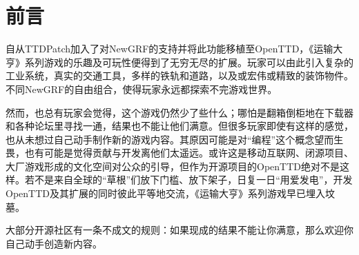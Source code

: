 \section{前言}
\par 
自从TTDPatch加入了对NewGRF的支持并将此功能移植至OpenTTD，《运输大亨》系列游戏的乐趣及可玩性便得到了无穷无尽的扩展。玩家可以由此引入复杂的工业系统，真实的交通工具，多样的铁轨和道路，以及或宏伟或精致的装饰物件。不同NewGRF的自由组合，使得玩家永远都探索不完游戏世界。
\par
然而，也总有玩家会觉得，这个游戏仍然少了些什么；哪怕是翻箱倒柜地在下载器和各种论坛里寻找一通，结果也不能让他们满意。但很多玩家即使有这样的感觉，也从未想过自己动手制作新的游戏内容。其原因可能是对“编程”这个概念望而生畏，也有可能是觉得贡献与开发离他们太遥远。或许这是移动互联网、闭源项目、大厂游戏形成的文化空间对公众的引导，但作为开源项目的OpenTTD绝对不是这样。若不是来自全球的“草根”们放下门槛、放下架子，日复一日“用爱发电”，开发OpenTTD及其扩展的同时彼此平等地交流，《运输大亨》系列游戏早已埋入坟墓。
\par 
大部分开源社区有一条不成文的规则：如果现成的结果不能让你满意，那么欢迎你自己动手创造新内容。